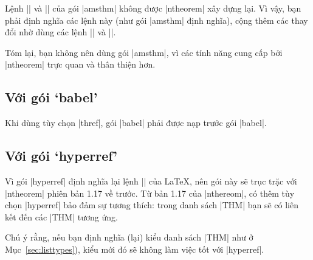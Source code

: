 \medskip
Lệnh |\newtheoremstyle| và |\swapnumbers| của gói |amsthm| không
được |ntheorem| xây dựng lại. Vì vậy,
bạn phải định nghĩa các lệnh này (như gói |amsthm| định nghĩa),
cộng thêm các thay đổi nhờ dùng các lệnh |\theoremheaderfont|
và |\theorembodyfont|.

\medskip
Tóm lại, bạn không nên dùng gói |amsthm|, vì các tính năng
cung cấp bởi |ntheorem| trực quan và thân thiện hơn.

\subsection{Với gói `babel'}\label{sec:babel}

Khi dùng tùy chọn |thref|, gói |babel| phải được nạp trước gói |babel|.

\subsection{Với gói `hyperref'}
\label{sec:hyperref}

Vì gói |hyperref| định nghĩa lại lệnh |\contentsline| của \LaTeX{},
nên gói này sẽ trục trặc với |ntheorem| phiên bản 1.17 về trước.
Từ bản 1.17 của |nthereom|, có thêm tùy chọn |hyperref| bảo đảm
sự tương thích: trong danh sách |THM| bạn sẽ có liên kết đến các |THM| tương ứng.

\medskip
Chú ý rằng,
nếu bạn định nghĩa (lại) kiểu danh sách |THM| như ở Mục~\vref{sec:listtypes}),
kiểu mới đó sẽ không làm việc tốt với |hyperref|.

\endinput
